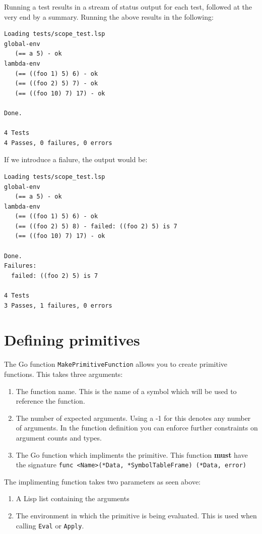 \documentclass[12pt]{article}
\begin{document}
Running a test results in a stream of status output for each test,
followed at the very end by a summary.  Running the above results in
the following:

\begin{verbatim}
Loading tests/scope_test.lsp
global-env
   (== a 5) - ok
lambda-env
   (== ((foo 1) 5) 6) - ok
   (== ((foo 2) 5) 7) - ok
   (== ((foo 10) 7) 17) - ok

Done.

4 Tests
4 Passes, 0 failures, 0 errors
\end{verbatim}

If we introduce a fialure, the output would be:

\begin{verbatim}
Loading tests/scope_test.lsp
global-env
   (== a 5) - ok
lambda-env
   (== ((foo 1) 5) 6) - ok
   (== ((foo 2) 5) 8) - failed: ((foo 2) 5) is 7
   (== ((foo 10) 7) 17) - ok

Done.
Failures:
  failed: ((foo 2) 5) is 7

4 Tests
3 Passes, 1 failures, 0 errors
\end{verbatim}
\section{Defining primitives}

The Go function \verb|MakePrimitiveFunction| allows you to create
primitive functions. This takes three arguments:

\begin{enumerate}
\item The function name. This is the name of a symbol which will be
  used to reference the function. 
\item The number of expected arguments. Using a -1 for this denotes
  any number of arguments. In the function definition you can enforce
  further constraints on argument counts and types. 
\item The Go function which impliments the primitive. This function
  {\bf must} have the signature
  \verb|func <Name>(*Data, *SymbolTableFrame) (*Data, error)| 
\end{enumerate}

\noindent The implimenting function takes two parameters as seen
above:

\begin{enumerate}
\item A Lisp list containing the arguments
\item The environment in which the primitive
  is being evaluated. This is used when calling \verb|Eval| or \verb|Apply|.
\end{enumerate}
\end{document}
